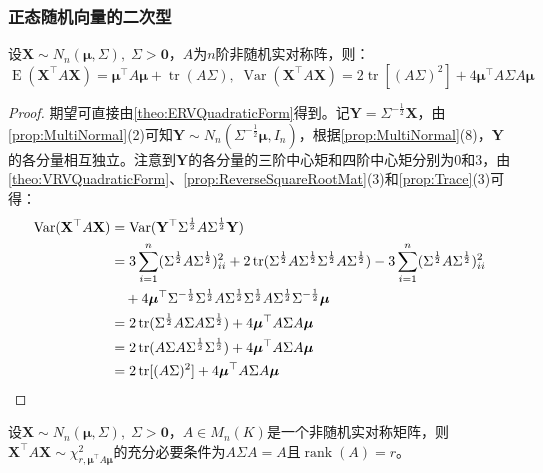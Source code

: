 \subsubsection{正态随机向量的二次型}
\begin{theorem}
	设$\mathbf{X}\sim N_n(\boldsymbol{\mu},\Sigma),\;\Sigma>\mathbf{0}$，$A$为$n$阶非随机实对称阵，则：
	\begin{equation*}
		\operatorname{E}(\mathbf{X}^{\top}A\mathbf{X})=\boldsymbol{\mu}^{\top}A\boldsymbol{\mu}+\operatorname{tr}(A\Sigma),\;
		\operatorname{Var}(\mathbf{X}^{\top}A\mathbf{X})=2\operatorname{tr}[(A\Sigma)^2]+4\boldsymbol{\mu}^{\top}A\Sigma A\boldsymbol{\mu}
	\end{equation*}
\end{theorem}
\begin{proof}
	期望可直接由\cref{theo:ERVQuadraticForm}得到。记$\mathbf{Y}=\Sigma^{-\frac{1}{2}}\mathbf{X}$，由\cref{prop:MultiNormal}(2)可知$\mathbf{Y}\sim N_n(\Sigma^{-\frac{1}{2}}\boldsymbol{\mu},I_n)$，根据\cref{prop:MultiNormal}(8)，$\mathbf{Y}$的各分量相互独立。注意到$\mathbf{Y}$的各分量的三阶中心矩和四阶中心矩分别为$0$和$3$，由\cref{theo:VRVQuadraticForm}、\cref{prop:ReverseSquareRootMat}(3)和\cref{prop:Trace}(3)可得：
	\begin{align*}
		\operatorname{Var}(\mathbf{X}^{\top}A\mathbf{X})
		&=\operatorname{Var}(\mathbf{Y}^{\top}\Sigma^{\frac{1}{2}}A\Sigma^{\frac{1}{2}}\mathbf{Y}) \\
		&=3\sum_{i=1}^{n}(\Sigma^{\frac{1}{2}}A\Sigma^{\frac{1}{2}})_{ii}^2+2\operatorname{tr}(\Sigma^{\frac{1}{2}}A\Sigma^{\frac{1}{2}}\Sigma^{\frac{1}{2}}A\Sigma^{\frac{1}{2}})-3\sum_{i=1}^{n}(\Sigma^{\frac{1}{2}}A\Sigma^{\frac{1}{2}})_{ii}^2 \\
		&\quad+4\boldsymbol{\mu}^{\top}\Sigma^{-\frac{1}{2}}\Sigma^{\frac{1}{2}}A\Sigma^{\frac{1}{2}}\Sigma^{\frac{1}{2}}A\Sigma^{\frac{1}{2}}\Sigma^{-\frac{1}{2}}\boldsymbol{\mu} \\
		&=2\operatorname{tr}(\Sigma^{\frac{1}{2}}A\Sigma A\Sigma^{\frac{1}{2}})+4\boldsymbol{\mu}^{\top}A\Sigma A\boldsymbol{\mu} \\
		&=2\operatorname{tr}(A\Sigma A\Sigma^{\frac{1}{2}}\Sigma^{\frac{1}{2}})+4\boldsymbol{\mu}^{\top}A\Sigma A\boldsymbol{\mu} \\
		&=2\operatorname{tr}[(A\Sigma)^2]+4\boldsymbol{\mu}^{\top}A\Sigma A\boldsymbol{\mu}\qedhere
	\end{align*}
\end{proof}
\begin{theorem}\label{theo:XAXChi2}
	设$\mathbf{X}\sim N_n(\boldsymbol{\mu},\Sigma),\;\Sigma>\mathbf{0}$，$A\in M_{n}(K)$是一个非随机实对称矩阵，则$\mathbf{X}^{\top}A\mathbf{X}\sim\chi_{r,\boldsymbol{\mu}^{\top}A\boldsymbol{\mu}}^2$的充分必要条件为$A\Sigma A=A$且$\operatorname{rank}(A)=r$。
\end{theorem}
